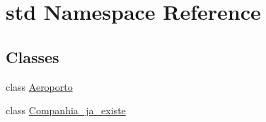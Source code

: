 \hypertarget{namespacestd}{
\section{std Namespace Reference}
\label{namespacestd}
}
\subsection*{Classes}
\begin{DoxyCompactItemize}
\item 
class \hyperlink{classstd_1_1_aeroporto}{Aeroporto}
\item 
class \hyperlink{classstd_1_1_companhia__ja__existe}{Companhia\_\-ja\_\-existe}
\end{DoxyCompactItemize}
